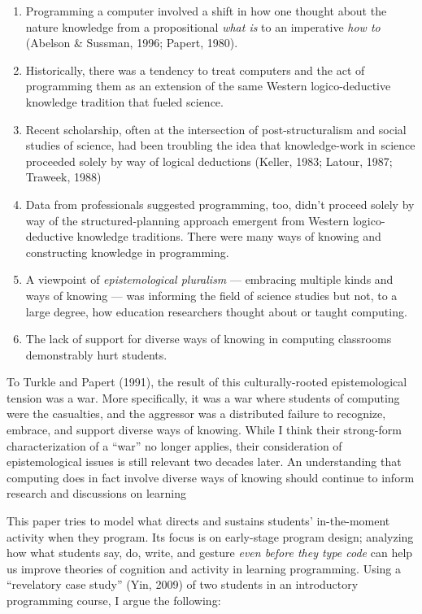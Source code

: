 \begin{enumerate}
\def\labelenumi{\arabic{enumi}.}
\item
  Programming a computer involved a shift in how one thought about the
  nature knowledge from a propositional \emph{what is} to an imperative
  \emph{how to} (Abelson \& Sussman, 1996; Papert, 1980).
\item
  Historically, there was a tendency to treat computers and the act of
  programming them as an extension of the same Western logico-deductive
  knowledge tradition that fueled science.
\item
  Recent scholarship, often at the intersection of post-structuralism
  and social studies of science, had been troubling the idea that
  knowledge-work in science proceeded solely by way of logical
  deductions (Keller, 1983; Latour, 1987; Traweek, 1988)
\item
  Data from professionals suggested programming, too, didn't proceed
  solely by way of the structured-planning approach emergent from
  Western logico-deductive knowledge traditions. There were many ways of
  knowing and constructing knowledge in programming.
\item
  A viewpoint of \emph{epistemological pluralism} --- embracing multiple
  kinds and ways of knowing --- was informing the field of science
  studies but not, to a large degree, how education researchers thought
  about or taught computing.
\item
  The lack of support for diverse ways of knowing in computing
  classrooms demonstrably hurt students.
\end{enumerate}

To Turkle and Papert (1991), the result of this culturally-rooted
epistemological tension was a war. More specifically, it was a war where
students of computing were the casualties, and the aggressor was a
distributed failure to recognize, embrace, and support diverse ways of
knowing. While I think their strong-form characterization of a ``war''
no longer applies, their consideration of epistemological issues is
still relevant two decades later. An understanding that computing does
in fact involve diverse ways of knowing should continue to inform
research and discussions on learning

This paper tries to model what directs and sustains students'
in-the-moment activity when they program. Its focus is on early-stage
program design; analyzing how what students say, do, write, and gesture
\emph{even before they type code} can help us improve theories of
cognition and activity in learning programming. Using a ``revelatory
case study'' (Yin, 2009) of two students in an introductory programming
course, I argue the following:

